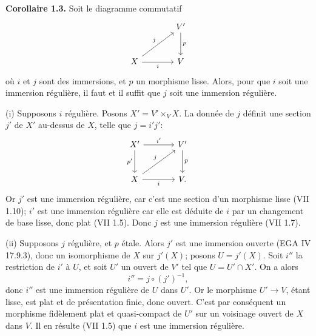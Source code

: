 \documentclass[11pt]{article}
\begin{document}
\textbf{Corollaire 1.3.} Soit le diagramme commutatif
\[
\begin{tikzcd}[column sep=large,row sep=large]
& V' \arrow[d,"p"]\\
X \arrow[ur,"j"] \arrow[r,"i"'] & V
\end{tikzcd}
\]
où $i$ et $j$ sont des immersions, et $p$ un morphisme lisse. Alors, pour que $i$ soit une immersion régulière, il faut et il suffit que $j$ soit une immersion régulière.

(i) Supposons $i$ régulière. Posons $X'=V'\times_V X$. La donnée de $j$ définit une section $j'$ de $X'$ au-dessus de $X$, telle que $j=i'j'$:
\[
\begin{tikzcd}[column sep=large,row sep=large]
X' \arrow[r,"i'"] \arrow[d,"p'"'] & V' \arrow[d,"p"]\\
X \arrow[r,"i"'] \arrow[ur,"j"] & V .
\end{tikzcd}
\]
Or $j'$ est une immersion régulière, car c'est une section d'un morphisme lisse (VII 1.10); $i'$ est une immersion régulière car elle est déduite de $i$ par un changement de base lisse, donc plat (VII 1.5). Donc $j$ est une immersion régulière (VII 1.7).

(ii) Supposons $j$ régulière, et $p$ étale. Alors $j'$ est une immersion ouverte (EGA IV 17.9.3), donc un isomorphisme de $X$ sur $j'(X)$; posons $U=j'(X)$. Soit $i''$ la restriction de $i'$ à $U$, et soit $U'$ un ouvert de $V'$ tel que $U=U'\cap X'$. On a alors
\[
i''=j\circ(j')^{-1},
\]
donc $i''$ est une immersion régulière de $U$ dans $U'$. Or le morphisme $U'\to V$, étant lisse, est plat et de présentation finie, donc ouvert. C'est par conséquent un morphisme fidèlement plat et quasi-compact de $U'$ sur un voisinage ouvert de $X$ dans $V$. Il en résulte (VII 1.5) que $i$ est une immersion régulière.
\end{document}

